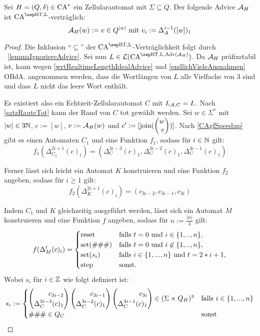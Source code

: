 \begin{theorem}
    \label{thmAdviceMain}
    Sei $H = (Q, \delta) \in \textrm{CA}^*$ ein Zellularautomat mit $\Sigma \subseteq Q$.
    Der folgende Advice $\mathcal{A}_H$ ist $\CAM{\CART, \CALeft}$-verträglich:
    \[
        \mathcal{A}_H(w) := v \in Q^{|w|} \text{ mit } v_i := \Delta_A^{i-1}([w])_1
    \]
\end{theorem}
\begin{proof}
    Die Inklusion \enquote{$\subseteq$} der $\CAM{\CART, \CALeft}$-Verträglichkeit folgt durch ~\cref{lemmaIgnoriereAdvice}.
    Sei nun $L \in \CAL{\CART, \CALeft, \orakel({\advA_H})}$.
    Da $\mathcal{A}_H$ präfixstabil ist, kann wegen \cref{wrtRealtimeLengthIdealAdvice} und \cref{endlichVieleAusnahmen}
    \acs{OBdA.} angenommen werden,
    dass die Wortlängen von $L$ alle Vielfache von $3$ sind und dass $L$ nicht das leere Wort enthält.

    Es existiert also ein Echtzeit-Zellularautomat $C$ mit $L_{\mathcal{A}, C} = L$. Nach \cref{satzRauteTot} kann der Rand von $C$ tot gewählt werden.
    Sei $w \in \Sigma^*$ mit $|w| \in 3\mathbb{N}$, $c := [w]$, $v := \mathcal{A}_H(w)$ und $c' := [\joinw(\Spvek{ w; v})]$.
    Nach \cref{CAgfSpeedup} gibt es einen Automaten $C_1$ und eine Funktion $f_1$, sodass für $i \in \mathbb{N}$ gilt:
    \[
        f_1(\Delta_{C_2}^{2i+1}(c)_i) = (\Delta_C^{3i-3}(c)_1, \Delta_C^{3i-2}(c)_1, \Delta_C^{3i-1}(c)_1)
    \]
    
    Ferner lässt sich leicht ein Automat $K$ konstruieren und eine Funktion $f_2$ angeben, sodass für $i \geq 1$ gilt:
    \[
        f_2(\Delta_{K}^{2i+1}(c)_i) = (c_{3i-2}, c_{3i-1}, c_{3i})
    \]
    
    Indem $C_1$ und $K$ gleichzeitig ausgeführt werden, lässt sich ein Automat $M$ konstruieren und eine Funktion $f$ angeben,
    sodass für $n := \frac{|w|}{3}$ gilt:
    \[
        f(\Delta_M^t(c)_i) =
        \begin{cases}
            \mathrm{reset} & \text{falls } t = 0 \text{ und } i \in \{ {1, .., n} \}, \\
            \mathrm{set}(\#\#\#) & \text{falls } t = 0 \text{ und } i \not\in \{ {1, .., n} \}, \\
            \mathrm{set}(s_i)
                & \text{falls } i \in \{ {1, ..., n} \} \text{ und } t = 2 * i + 1, \\
            \mathrm{step} & \text{sonst.}
        \end{cases}
    \]
    Wobei $s_i$ für $i \in \mathbb{Z}$ wie folgt definiert ist:
    \[
        s_i := \begin{cases}
                    \Spvek{ c_{3i-2} ; \Delta_C^{3i-3}(c)_1 }
                        \Spvek{ c_{3i-1} ; \Delta_C^{3i-2}(c)_1} 
                        \Spvek{ c_{3i} ; \Delta_C^{3i-1}(c)_1}
                        \in (\Sigma \times Q_H)^3
                        & \text{falls } i \in \finset{ 1, ..., n } \\
                    \#\#\# \in Q_C & \text{sonst} 
                \end{cases}
    \]
    

\end{proof}
